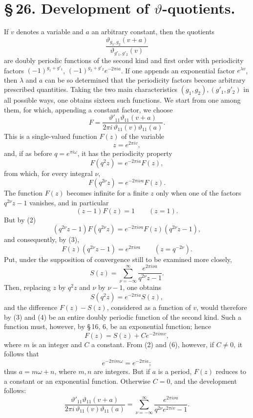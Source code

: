 \documentclass[11pt]{article}
\newcommand{\tht}{\vartheta}
\begin{document}
\section*{\S\,26. Development of $\vartheta$-quotients.}

If $v$ denotes a variable and $a$ an arbitrary constant, then the quotients
\[
\frac{\tht_{g_1,g_2}(v+a)}{\tht_{g'_1,g'_2}(v)}
\]
are doubly periodic functions of the second kind and first order with periodicity factors $(-1)^{g_1+g'_1}$, $(-1)^{g_2+g'_2}e^{-2\pi ia}$. If one appends an exponential factor $e^{\lambda v}$, then $\lambda$ and $a$ can be so determined that the periodicity factors become arbitrary prescribed quantities. Taking the two main characteristics $(g_1,g_2),(g'_1,g'_2)$ in all possible ways, one obtains sixteen such functions. We start from one among them, for which, appending a constant factor, we choose
\begin{equation}
F=\frac{\tht'_{11}\tht_{11}(v+a)}{2\pi i\,\tht_{11}(v)\tht_{11}(a)}.
\tag{1}
\end{equation}
This is a single-valued function $F(z)$ of the variable
\[
z=e^{2\pi iv},
\]
and, if as before $q=e^{\pi i\omega}$, it has the periodicity property
\begin{equation}
F(q^2z)=e^{-2\pi ia}F(z),
\tag{2}
\end{equation}
from which, for every integral $\nu$,
\[
F(q^{2\nu}z)=e^{-2\pi i\nu a}F(z).
\]
The function $F(z)$ becomes infinite for a finite $z$ only when one of the factors $q^{2\nu}z-1$ vanishes, and in particular
\begin{equation}
(z-1)F(z)=1\qquad (z=1).
\tag{3}
\end{equation}
But by (2)
\[
(q^{2\nu}z-1)F(q^{2\nu}z)=e^{-2\pi i\nu a}F(z)(q^{2\nu}z-1),
\]
and consequently, by (3),
\begin{equation}
F(z)(q^{2\nu}z-1)=e^{2\pi i\nu a}\qquad (z=q^{-2\nu}).
\tag{4}
\end{equation}
Put, under the supposition of convergence still to be examined more closely,
\begin{equation}
S(z)=\sum_{\nu=-\infty}^{\infty}\frac{e^{2\pi i\nu a}}{q^{2\nu}z-1}.
\tag{5}
\end{equation}
Then, replacing $z$ by $q^2z$ and $\nu$ by $\nu-1$, one obtains
\begin{equation}
S(q^2z)=e^{-2\pi ia}S(z),
\tag{6}
\end{equation}
and the difference $F(z)-S(z)$, considered as a function of $v$, would therefore by (3) and (4) be an entire doubly periodic function of the second kind. Such a function must, however, by \S\,16, 6, be an exponential function; hence
\[
F(z)=S(z)+Ce^{-2\pi imv},
\]
where $m$ is an integer and $C$ a constant. From (2) and (6), however, if $C\ne0$, it follows that
\[
e^{-2\pi im\omega}=e^{-2\pi ia};
\]
thus $a=m\omega+n$, where $m,n$ are integers. But if $a$ is a period, $F(z)$ reduces to a constant or an exponential function. Otherwise $C=0$, and the development follows:
\begin{equation}
\frac{\tht'_{11}\tht_{11}(v+a)}{2\pi i\,\tht_{11}(v)\tht_{11}(a)}
=\sum_{\nu=-\infty}^{\infty}\frac{e^{2\pi i\nu a}}{q^{2\nu}e^{2\pi iv}-1}.
\tag{7}
\end{equation}
\end{document}
